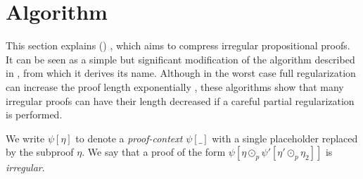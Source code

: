 \section{Algorithm {\RecyclePivotsIntersection}}
\label{Section:RPI}

\newcommand{\tRes}{\odot}
\newcommand{\tResFact}{\otimes}
\newcommand{\tResChain}{\ominus}
\newcommand{\AXC}{\AxiomC}
\newcommand{\BIC}{\BinaryInfC}
\newcommand{\RName}[1]{\RightLabel{#1}}
\newcommand{\p}[1]{\hat{#1}}
\newcommand{\ub}[2]{\underbrace{#1}_{#2}}
\newcommand{\tResStar}{\circledast}



This section explains {\RecyclePivotsIntersection} ({\RPI}) \cite{LURPI}, which aims to compress irregular propositional proofs. It can be seen as a simple 
but significant modification of the {\RP} algorithm described in 
\cite{RP08}, 
from which it derives its name. 
Although in the worst case full regularization can increase the proof length exponentially 
\cite{Tseitin}, these algorithms show that 
many irregular proofs can have their length decreased if a careful partial regularization is performed. 

We write $\psi[\eta]$ to denote a \emph{proof-context}
$\psi[\_]$ with a single placeholder replaced by the subproof $\eta$.
We say that a proof of the form $\psi[\eta \tRes_p \psi'[\eta'\tRes_p\eta_2]]$ is \emph{irregular}.

